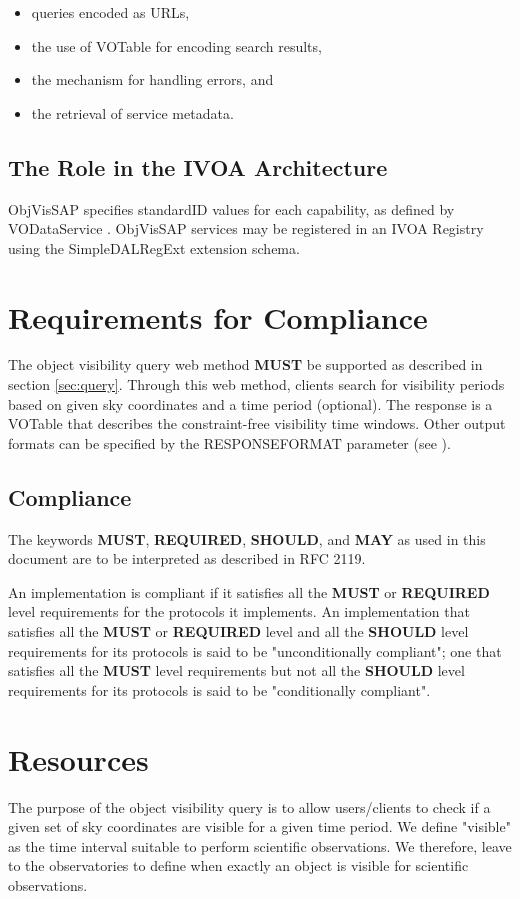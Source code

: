 \documentclass[11pt,a4paper]{ivoatex/ivoa}
\begin{document}
\begin{itemize}
\item queries encoded as URLs,
\item the use of VOTable for encoding search results,
\item the mechanism for handling errors, and
\item the retrieval of service metadata.
\end{itemize}


\subsection{The Role in the IVOA Architecture}
ObjVisSAP specifies standardID values \citep{2016ivoa.spec.0523D} for each
capability, as defined by VODataService \citep{2010ivoa.spec.1202P}. ObjVisSAP
services may be registered in an IVOA Registry using the SimpleDALRegExt
\citep{2017ivoa.spec.0530P} extension schema.


\section{Requirements for Compliance}
The object visibility query web method \textbf{MUST} be supported as described
in section \ref{sec:query}. Through this web method, clients search for visibility
periods based on given sky coordinates and a time period (optional). The
response is a VOTable that describes the constraint-free visibility time
windows. Other output formats can be specified by the RESPONSEFORMAT
parameter (see \citet{2017ivoa.spec.0517D}).

\subsection{Compliance}
The keywords \textbf{MUST}, \textbf{REQUIRED}, \textbf{SHOULD},
and \textbf{MAY} as used in this document are to be interpreted as
described in RFC 2119.

An implementation is compliant if it satisfies all the \textbf{MUST}
or \textbf{REQUIRED} level requirements for the protocols it
implements. An implementation that satisfies all the \textbf{MUST} or
\textbf{REQUIRED} level and all the \textbf{SHOULD} level
requirements for its protocols is said to be "unconditionally
compliant"; one that satisfies all the \textbf{MUST} level
requirements but not all the \textbf{SHOULD} level requirements for
its protocols is said to be "conditionally compliant".

\section{Resources}
The purpose of the object visibility query is to allow users/clients to
check if a given set of sky coordinates are visible for a given time
period. We define "visible" as the time interval suitable to perform
scientific observations. We therefore, leave to the observatories to
define when exactly an object is visible for scientific observations.
\end{document}
